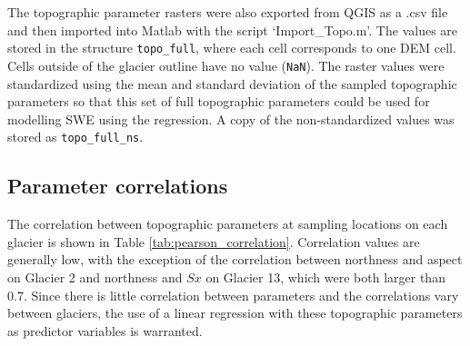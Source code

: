 \documentclass[12pt]{article}
\begin{document}
The topographic parameter rasters were also exported from QGIS as a .csv file and then imported into Matlab with the script `Import\_Topo.m'. The values are stored in the structure \texttt{topo\_full}, where each cell corresponds to one DEM cell. Cells outside of the glacier outline have no value (\texttt{NaN}). The raster values were standardized using the mean and standard deviation of the sampled topographic parameters so that this set of full topographic parameters could be used for modelling SWE using the regression. A copy of the non-standardized values was stored as \texttt{topo\_full\_ns}.

\subsection{Parameter correlations}

The correlation between topographic parameters at sampling locations on each glacier is shown in Table \ref{tab:pearson_correlation}. Correlation values are generally low, with the exception of the correlation between northness and aspect on Glacier 2 and northness and $Sx$ on Glacier 13, which were both larger than 0.7. Since there is little correlation between parameters and the correlations vary between glaciers, the use of a linear regression with these topographic parameters as predictor variables is warranted. 
\end{document}

